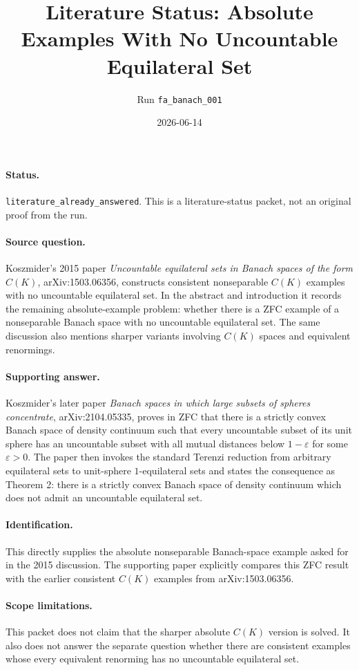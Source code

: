 \documentclass[11pt]{article}
\title{Literature Status: Absolute Examples With No Uncountable Equilateral Set}
\author{Run \texttt{fa\_banach\_001}}
\date{2026-06-14}
\begin{document}
\maketitle

\paragraph{Status.}
\texttt{literature\_already\_answered}.  This is a literature-status packet,
not an original proof from the run.

\paragraph{Source question.}
Koszmider's 2015 paper \emph{Uncountable equilateral sets in Banach spaces of
the form $C(K)$}, arXiv:1503.06356, constructs consistent nonseparable
$C(K)$ examples with no uncountable equilateral set.  In the abstract and
introduction it records the remaining absolute-example problem: whether there
is a ZFC example of a nonseparable Banach space with no uncountable
equilateral set.  The same discussion also mentions sharper variants involving
$C(K)$ spaces and equivalent renormings.

\paragraph{Supporting answer.}
Koszmider's later paper \emph{Banach spaces in which large subsets of spheres
concentrate}, arXiv:2104.05335, proves in ZFC that there is a strictly convex
Banach space of density continuum such that every uncountable subset of its
unit sphere has an uncountable subset with all mutual distances below
$1-\varepsilon$ for some $\varepsilon>0$.  The paper then invokes the standard
Terenzi reduction from arbitrary equilateral sets to unit-sphere
$1$-equilateral sets and states the consequence as Theorem 2: there is a
strictly convex Banach space of density continuum which does not admit an
uncountable equilateral set.

\paragraph{Identification.}
This directly supplies the absolute nonseparable Banach-space example asked
for in the 2015 discussion.  The supporting paper explicitly compares this
ZFC result with the earlier consistent $C(K)$ examples from arXiv:1503.06356.

\paragraph{Scope limitations.}
This packet does not claim that the sharper absolute $C(K)$ version is solved.
It also does not answer the separate question whether there are consistent
examples whose every equivalent renorming has no uncountable equilateral set.
\end{document}
